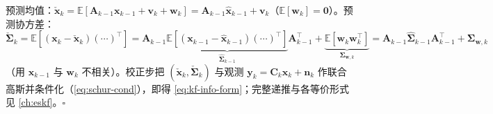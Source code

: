 \begin{derivation}
预测均值：$\check{\mathbf{x}}_k=\mathbb{E}[\mathbf{A}_{k-1}\mathbf{x}_{k-1}+\mathbf{v}_k+\mathbf{w}_k]=\mathbf{A}_{k-1}\hat{\mathbf{x}}_{k-1}+\mathbf{v}_k$（$\mathbb{E}[\mathbf{w}_k]=\mathbf{0}$）。预测协方差：$\check{\boldsymbol{\Sigma}}_k=\mathbb{E}[(\mathbf{x}_k-\check{\mathbf{x}}_k)(\cdots)^\top]=\mathbf{A}_{k-1}\underbrace{\mathbb{E}[(\mathbf{x}_{k-1}-\hat{\mathbf{x}}_{k-1})(\cdots)^\top]}_{\hat{\boldsymbol{\Sigma}}_{k-1}}\mathbf{A}_{k-1}^\top+\underbrace{\mathbb{E}[\mathbf{w}_k\mathbf{w}_k^\top]}_{\boldsymbol{\Sigma}_{\mathbf{w},k}}=\mathbf{A}_{k-1}\hat{\boldsymbol{\Sigma}}_{k-1}\mathbf{A}_{k-1}^\top+\boldsymbol{\Sigma}_{\mathbf{w},k}$（用 $\mathbf{x}_{k-1}$ 与 $\mathbf{w}_k$ 不相关）。校正步把 $(\check{\mathbf{x}}_k,\check{\boldsymbol{\Sigma}}_k)$ 与观测 $\mathbf{y}_k=\mathbf{C}_k\mathbf{x}_k+\mathbf{n}_k$ 作联合高斯并条件化（\cref{eq:schur-cond}），即得 \cref{eq:kf-info-form}；完整递推与各等价形式见 \cref{ch:eskf}。\hfill$\square$
\end{derivation}
